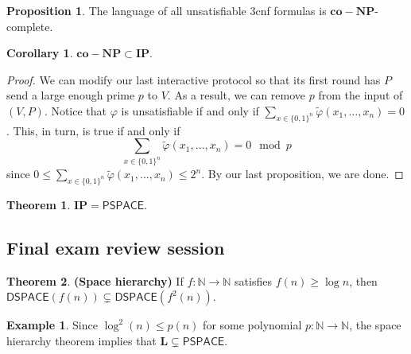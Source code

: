 \documentclass[10pt,letterpaper,cm]{nupset}
\theoremstyle{definition}
\newtheorem{exmp}{Example}
\newtheorem{prop}{Proposition}
\newtheorem{theorem}{Theorem}
\newtheorem{corollary}{Corollary}
\newcommand{\N}{\mathbb N}
\newcommand{\1}{\mathbf{1}}
\newcommand{\0}{\vec 0}
\begin{document}
\begin{prop}
The language of all unsatisfiable 3cnf formulas is $\mathbf{co{-}NP}$-complete.
\end{prop}

\begin{corollary}
$\mathbf{co{-}NP} \subset \mathbf{IP}$.
\end{corollary}
\begin{proof}
We can modify our last interactive protocol so that its first round has $P$ send a large enough prime $p$ to $V$. As a result, we can remove $p$ from the input of $(V, P)$. Notice that $\varphi$ is unsatisfiable if and only if $\sum_{x\in \{0,1\}^n} \tilde{\varphi}(x_1, \ldots, x_n) =0$. This, in turn, is true if and only if  $$ \sum_{x\in \{0,1\}^n} \tilde{\varphi}(x_1, \ldots, x_n) =0 \mod p$$ since  $0\leq \sum_{x\in \{0,1\}^n} \tilde{\varphi}(x_1, \ldots, x_n) \leq 2^n$. By our last proposition, we are done. 
\end{proof}

\begin{theorem}
$\mathbf{IP} = \mathsf{PSPACE}$.
\end{theorem}

\subsection{Final exam review session}

\begin{theorem}{\textbf{(Space hierarchy)}}
If $f: \N \to \N$ satisfies $f(n) \geq \log{n}$, then $\mathsf{DSPACE}(f(n)) \subsetneq \mathsf{DSPACE}(f^2(n))$.
\end{theorem}

\begin{exmp}
 Since $\log^2(n) \leq p(n)$ for some polynomial $p: \N \to \N$, the space hierarchy theorem implies that $\mathbf{L} \subsetneq \mathsf{PSPACE}$.
\end{exmp}
\end{document}
